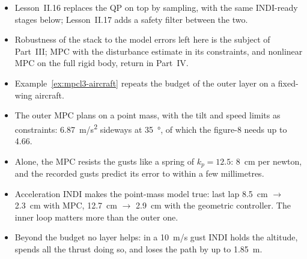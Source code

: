 \begin{lookahead}
\begin{itemize}[leftmargin=1.2em]
  \item Lesson~II.16 replaces the QP on top by sampling, with the same INDI-ready stages below; Lesson~II.17 adds a safety filter between the two.
  \item Robustness of the stack to the model errors left here is the subject of Part~III; MPC with the disturbance estimate in its constraints, and nonlinear MPC on the full rigid body, return in Part~IV.
  \item Example~\ref{ex:mpcl3-aircraft} repeats the budget of the outer layer on a fixed-wing aircraft.
\end{itemize}
\end{lookahead}

\begin{remember}
\begin{itemize}
  \item The outer MPC plans on a point mass, with the tilt and speed limits as constraints: \SI{6.87}{m/s^2} sideways at \SI{35}{\degree}, of which the figure-8 needs up to 4.66.
  \item Alone, the MPC resists the gusts like a spring of $k_p = 12.5$: \SI{8}{cm} per newton, and the recorded gusts predict its error to within a few millimetres.
  \item Acceleration INDI makes the point-mass model true: last lap \SI{8.5}{cm} $\to$ \SI{2.3}{cm} with MPC, \SI{12.7}{cm} $\to$ \SI{2.9}{cm} with the geometric controller. The inner loop matters more than the outer one.
  \item Beyond the budget no layer helps: in a \SI{10}{m/s} gust INDI holds the altitude, spends all the thrust doing so, and loses the path by up to \SI{1.85}{m}.
\end{itemize}
\end{remember}


